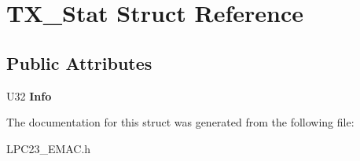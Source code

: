 \hypertarget{struct_t_x___stat}{
\section{TX\_\-Stat Struct Reference}
\label{struct_t_x___stat}
}
\subsection*{Public Attributes}
\begin{DoxyCompactItemize}
\item 
\hypertarget{struct_t_x___stat_a77f3389a90e979b2703613bc6ed3da04}{
U32 {\bfseries Info}}
\label{struct_t_x___stat_a77f3389a90e979b2703613bc6ed3da04}

\end{DoxyCompactItemize}


The documentation for this struct was generated from the following file:\begin{DoxyCompactItemize}
\item 
LPC23\_\-EMAC.h\end{DoxyCompactItemize}
